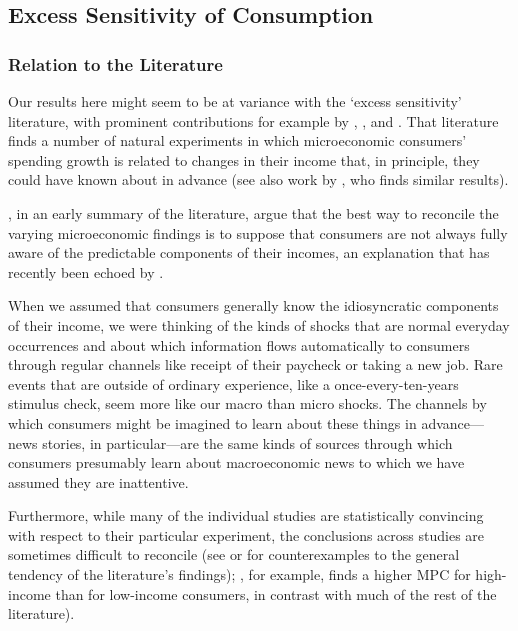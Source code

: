 
  \subsection{Excess Sensitivity of Consumption} \label{sec:ExcessSens}

  \subsubsection{Relation to the Literature}

  Our results here might seem to be at variance with the `excess sensitivity' literature, with prominent contributions for example by \cite{soulelesTaxRefunds}, \cite{jpsTax}, and \cite{psjmMPC2008}.  That literature finds a number of natural experiments in which microeconomic consumers' spending growth is related to changes in their income that, in principle, they could have known about in advance (see also work by \cite{kuengTaxnews}, who finds similar results).

  \cite{BrowningColladoAER}, in an early summary of the literature, argue that the best way to reconcile the varying microeconomic findings is to suppose that consumers are not always fully aware of the predictable components of their incomes, an explanation that has recently been echoed by \cite{parker25million}.

  When we assumed that consumers generally know the idiosyncratic components of their income, we were thinking of the kinds of shocks that are normal everyday occurrences and about which information flows automatically to consumers through regular channels like receipt of their paycheck or taking a new job.  Rare events that are outside of ordinary experience, like a once-every-ten-years stimulus check, seem more like our macro than micro shocks.  The channels by which consumers might be imagined to learn about these things in advance---news stories, in particular---are the same kinds of sources through which consumers presumably learn about macroeconomic news to which we have assumed they are inattentive. %

  Furthermore, while many of the individual studies are statistically convincing with respect to their particular experiment, the conclusions across studies are sometimes difficult to reconcile (see \cite{hsiehAlaska} or \cite{CoulibalyLiMortgage} for counterexamples to the general tendency of the literature's findings); \cite{kuengAlaska}, for example, finds a higher MPC for high-income than for low-income consumers, in contrast with much of the rest of the literature).



